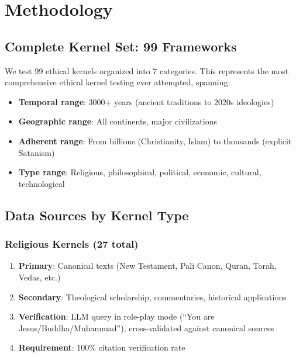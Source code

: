 \documentclass[11pt,a4paper]{article}
\theoremstyle{definition}
\theoremstyle{remark}
\begin{document}
\newpage

\section{Methodology}

\subsection{Complete Kernel Set: 99 Frameworks}

We test 99 ethical kernels organized into 7 categories. This represents the most comprehensive ethical kernel testing ever attempted, spanning:
\begin{itemize}
    \item \textbf{Temporal range}: 3000+ years (ancient traditions to 2020s ideologies)
    \item \textbf{Geographic range}: All continents, major civilizations
    \item \textbf{Adherent range}: From billions (Christianity, Islam) to thousands (explicit Satanism)
    \item \textbf{Type range}: Religious, philosophical, political, economic, cultural, technological
\end{itemize}

\subsection{Data Sources by Kernel Type}

\subsubsection{Religious Kernels (27 total)}
\begin{enumerate}
    \item \textbf{Primary}: Canonical texts (New Testament, Pali Canon, Quran, Torah, Vedas, etc.)
    \item \textbf{Secondary}: Theological scholarship, commentaries, historical applications
    \item \textbf{Verification}: LLM query in role-play mode (``You are Jesus/Buddha/Muhammad''), cross-validated against canonical sources
    \item \textbf{Requirement}: 100\% citation verification rate
\end{enumerate}
\end{document}
